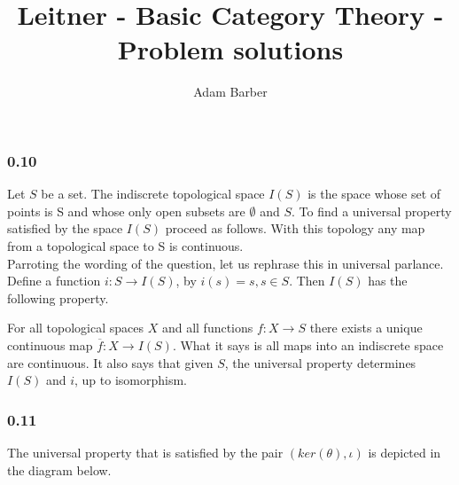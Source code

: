 \documentclass{article}
\begin{document}
\title{Leitner - Basic Category Theory - Problem solutions}
\author{Adam Barber}

\maketitle
\subsubsection*{0.10}

Let $S$ be a set. The indiscrete topological space $I(S)$ is the space whose set of points is S and whose only open subsets are $\emptyset$ and $S$.
To find a universal property satisfied by the space $I(S)$ proceed as follows.
With this topology any map from a topological space to S is continuous. \\

Parroting the wording of the question, let us rephrase this in
universal parlance. Define a function $i\colon S \rightarrow I(S)$, by $i(s) = s, s \in S$.
Then $I(S)$ has the following property.


\begin{center}
\end{center}

For all topological spaces $X$ and all functions
$f\colon X \rightarrow S$ there exists a unique continuous map $\overline{f}\colon X \rightarrow I(S)$. What it says is all maps into an indiscrete space are continuous. It also says that given $S$, the universal property determines $I(S)$ and $i$, up to isomorphism. \\

\subsubsection*{0.11}

The universal property that is satisfied by the pair $(ker(\theta),\iota)$ is depicted in the diagram below.
\end{document}
